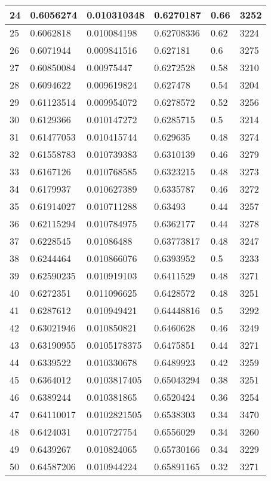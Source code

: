 \begin{longtable}{|l|l|l|l|l|l|}
24 & 0.6056274 & 0.010310348 & 0.6270187 & 0.66 & 3252 \\ \hline 
25 & 0.6062818 & 0.010084198 & 0.62708336 & 0.62 & 3224 \\ \hline 
26 & 0.6071944 & 0.009841516 & 0.627181 & 0.6 & 3275 \\ \hline 
27 & 0.60850084 & 0.00975447 & 0.6272528 & 0.58 & 3210 \\ \hline 
28 & 0.6094622 & 0.009619824 & 0.627478 & 0.54 & 3204 \\ \hline 
29 & 0.61123514 & 0.009954072 & 0.6278572 & 0.52 & 3256 \\ \hline 
30 & 0.6129366 & 0.010147272 & 0.6285715 & 0.5 & 3214 \\ \hline 
31 & 0.61477053 & 0.010415744 & 0.629635 & 0.48 & 3274 \\ \hline 
32 & 0.61558783 & 0.010739383 & 0.6310139 & 0.46 & 3279 \\ \hline 
33 & 0.6167126 & 0.010768585 & 0.6323215 & 0.48 & 3273 \\ \hline 
34 & 0.6179937 & 0.010627389 & 0.6335787 & 0.46 & 3272 \\ \hline 
35 & 0.61914027 & 0.010711288 & 0.63493 & 0.44 & 3257 \\ \hline 
36 & 0.62115294 & 0.010784975 & 0.6362177 & 0.44 & 3278 \\ \hline 
37 & 0.6228545 & 0.01086488 & 0.63773817 & 0.48 & 3247 \\ \hline 
38 & 0.6244464 & 0.010866076 & 0.6393952 & 0.5 & 3233 \\ \hline 
39 & 0.62590235 & 0.010919103 & 0.6411529 & 0.48 & 3271 \\ \hline 
40 & 0.6272351 & 0.011096625 & 0.6428572 & 0.48 & 3251 \\ \hline 
41 & 0.6287612 & 0.010949421 & 0.64448816 & 0.5 & 3292 \\ \hline 
42 & 0.63021946 & 0.010850821 & 0.6460628 & 0.46 & 3249 \\ \hline 
43 & 0.63190955 & 0.0105178375 & 0.6475851 & 0.44 & 3271 \\ \hline 
44 & 0.6339522 & 0.010330678 & 0.6489923 & 0.42 & 3259 \\ \hline 
45 & 0.6364012 & 0.0103817405 & 0.65043294 & 0.38 & 3251 \\ \hline 
46 & 0.6389244 & 0.010381865 & 0.6520424 & 0.36 & 3254 \\ \hline 
47 & 0.64110017 & 0.0102821505 & 0.6538303 & 0.34 & 3470 \\ \hline 
48 & 0.6424031 & 0.010727754 & 0.6556029 & 0.34 & 3260 \\ \hline 
49 & 0.6439267 & 0.010824065 & 0.65730166 & 0.34 & 3229 \\ \hline 
50 & 0.64587206 & 0.010944224 & 0.65891165 & 0.32 & 3271 \\ \hline 
\end{longtable}
